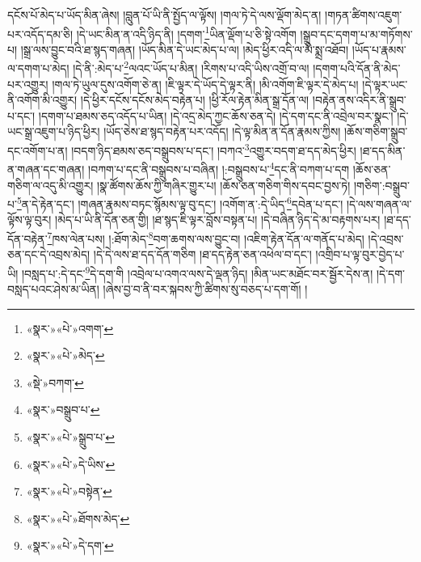 དངོས་པོ་མེད་པ་ཡོད་མིན་ཞེས། །བླུན་པོ་ཡི་ནི་སྤྱོད་ལ་ལྟོས། །གལ་ཏེ་དེ་ལས་ལྡོག་མེད་ན། །གཏན་ཚིགས་འཇུག་པར་འདོད་དམ་ཅི། །དེ་ཡང་མིན་ན་འདི་ཉིད་ནི། །དགག་\footnote{«སྣར་»«པེ་»འགག་}ཡིན་ལྡོག་པ་ཅི་སྟེ་འགོག །སྒྲུབ་དང་དགག་པ་མ་གཏོགས་པ། །སྒྲ་ལས་བྱུང་བའི་ཐ་སྙད་གཞན། །ཡོད་མིན་དེ་ཡང་མེད་པ་ལ། །མེད་ཕྱིར་འདི་ལ་མི་སྨྲ་འཐོབ། །ཡོད་པ་རྣམས་ལ་དགག་པ་མེད། །དེ་ནི་:མེད་པ་\footnote{«སྣར་»«པེ་»མེད་}ལའང་ཡོད་པ་མིན། །རིགས་པ་འདི་ཡིས་འགྲོ་བ་ལ། །དགག་པའི་དོན་ནི་མེད་པར་འགྱུར། །གལ་ཏེ་ཡུལ་དུས་འགོག་ཅེ་ན། །ཇི་ལྟར་དེ་ཡོད་དེ་ལྟར་ནི། །མི་འགོག་ཇི་ལྟར་དེ་མེད་པ། །དེ་ལྟར་ཡང་ནི་འགོག་མི་འགྱུར། །དེ་ཕྱིར་དངོས་དངོས་མེད་བརྟེན་པ། །ཕྱི་རོལ་རྟེན་མིན་སྒྲ་དོན་ལ། །བརྟེན་ནས་འདིར་ནི་སྒྲུབ་པ་དང་། །དགག་པ་ཐམས་ཅད་འདོད་པ་ཡིན། །དེ་འདྲ་མེད་ཀྱང་ཆོས་ཅན་དེ། །དེ་དག་དང་ནི་འབྲེལ་བར་སྣང་། །དེ་ཡང་སྒྲ་འཇུག་པ་ཉིད་ཕྱིར། །ཡོད་ཅེས་ཐ་སྙད་བརྟེན་པར་འདོད། །དེ་ལྟ་མིན་ན་དོན་རྣམས་ཀྱིས། །ཆོས་གཅིག་སྒྲུབ་དང་འགོག་པ་ན། །བདག་ཉིད་ཐམས་ཅད་བསྒྲུབས་པ་དང་། །བཀའ་\footnote{«སྡེ་»བཀག་}འགྱུར་བདག་ཐ་དད་མེད་ཕྱིར། །ཐ་དད་མིན་ན་གཞན་དང་གཞན། །བཀག་པ་དང་ནི་བསྒྲུབས་པ་བཞིན། །:བསྒྲུབས་པ་\footnote{«སྣར་»བསྒྲུབ་པ་}དང་ནི་བཀག་པ་དག །ཆོས་ཅན་གཅིག་ལ་འདུ་མི་འགྱུར། །སྣ་ཚོགས་ཆོས་ཀྱི་གཞིར་གྱུར་པ། །ཆོས་ཅན་གཅིག་གིས་དབང་བྱས་ཏེ། །གཅིག་:བསྒྲུབ་པ་\footnote{«སྣར་»«པེ་»སྒྲུབ་པ་}ན་དེ་རྟེན་དང་། །གཞན་རྣམས་བཏང་སྙོམས་ལྟ་བུ་དང་། །འགོག་ན་:དེ་ཡིད་\footnote{«སྣར་»«པེ་»དེ་ཡིས་}དབེན་པ་དང་། །དེ་ལས་གཞན་ལ་ལྟོས་ལྟ་བུར། །མེད་པ་ཡི་ནི་དོན་ཅན་གྱི། །ཐ་སྙད་ཇི་ལྟར་བློས་བསྟན་པ། །དེ་བཞིན་ཉིད་དེ་མ་བརྟགས་པར། །ཐ་དད་དོན་བརྟེན་\footnote{«སྣར་»«པེ་»བསྟེན་}ཁས་ལེན་པས། །:ཐོག་མེད་\footnote{«སྣར་»«པེ་»ཐོགས་མེད་}བག་ཆགས་ལས་བྱུང་བ། །འཇིག་རྟེན་དོན་ལ་གནོད་པ་མེད། །དེ་འབྲས་ཅན་དང་དེ་འབྲས་མེད། །དེ་དེ་ལས་ཐ་དད་དོན་གཅིག །ཐ་དད་རྟེན་ཅན་འཕེལ་བ་དང་། །འགྲིབ་པ་ལྟ་བུར་བྱེད་པ་ཡི། །བསླད་པ་:དེ་དང་\footnote{«སྣར་»«པེ་»དེ་དག་}དེ་དག་གི །འབྲེལ་པ་འགའ་ལས་དེ་ལྡན་ཉིད། །མིན་ཡང་མཐོང་བར་སྦྱོར་དེས་ན། །དེ་དག་བསླད་པའང་ཤེས་མ་ཡིན། །ཞེས་བྱ་བ་ནི་བར་སྐབས་ཀྱི་ཚིགས་སུ་བཅད་པ་དག་གོ། །
